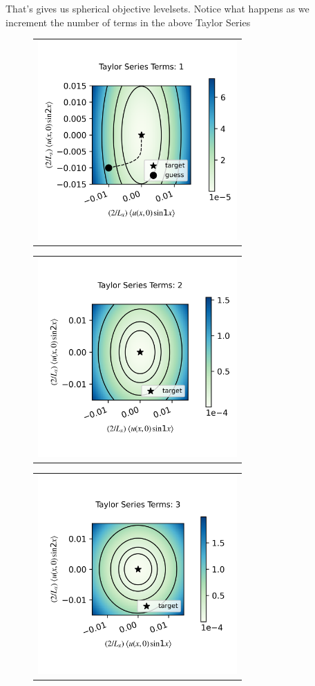 \documentclass[longbibliography,amsmath,amssymb,aps,nofootinbib]{revtex4-2}
\begin{document}
That's gives us spherical objective levelsets. Notice what happens as we increment the number of terms in the above Taylor Series


\begin{figure}[h]
  \centering
  \begin{tabular}{@{}c@{}}
      \includegraphics[width=3in]{SPHRtest_Nts1a0p3b0p0c0p0T1p0R0p015kt10p0kt20.png}
  \end{tabular}
  \begin{tabular}{@{}c@{}}
      \includegraphics[width=3in]{SPHRtest_Nts2a0p3b0p0c0p0T1p0R0p015kt10p0kt20.png}
  \end{tabular}
  \begin{tabular}{@{}c@{}}
      \includegraphics[width=3in]{SPHRtest_Nts3a0p3b0p0c0p0T1p0R0p015kt10p0kt20.png}

\end{tabular}
\end{figure}
\end{document}
